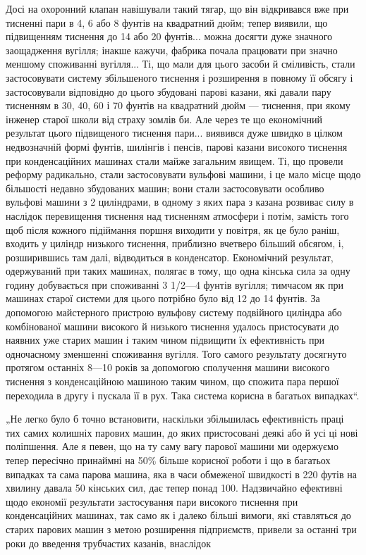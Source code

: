 Досі на охоронний клапан навішували такий тягар, що він відкривався вже при тисненні пари в 4, 6 або
8 фунтів на квадратний
дюйм; тепер виявили, що підвищенням тиснення до 14 або 20 фунтів... можна досягти дуже значного
заощадження вугілля; інакше
кажучи, фабрика почала працювати при значно меншому споживанні вугілля... Ті, що мали для цього
засоби й сміливість, стали
застосовувати систему збільшеного тиснення і розширення в повному її обсягу і застосовували
відповідно до цього збудовані парові казани, які давали пару тисненням в 30, 40, 60 і 70 фунтів на
квадратний дюйм — тиснення, при якому інженер старої школи
від страху зомлів би. Але через те що економічний результат
цього підвищеного тиснення пари... виявився дуже швидко в цілком недвозначній формі фунтів, шилінгів
і пенсів, парові казани
високого тиснення при конденсаційних машинах стали майже загальним явищем. Ті, що провели реформу
радикально, стали застосовувати вульфові машини, і це мало місце щодо більшості недавно
збудованих машин; вони стали застосовувати особливо вульфові
машини з 2 циліндрами, в одному з яких пара з казана розвиває силу в наслідок перевищення тиснення
над тисненням атмосфери і потім, замість того щоб після кожного підіймання поршня
виходити у повітря, як це було раніш, входить у циліндр
низького тиснення, приблизно вчетверо більший обсягом, і, розширившись там далі, відводиться в
конденсатор. Економічний
результат, одержуваний при таких машинах, полягає в тому, що
одна кінська сила за одну годину добувається при споживанні
3 1/2—4 фунтів вугілля; тимчасом як при машинах старої системи
для цього потрібно було від 12 до 14 фунтів. За допомогою
майстерного пристрою вульфову систему подвійного циліндра
або комбінованої машини високого й низького тиснення удалось
пристосувати до наявних уже старих машин і таким чином підвищити їх ефективність при одночасному
зменшенні споживання
вугілля. Того самого результату досягнуто протягом останніх
8—10 років за допомогою сполучення машини високого тиснення
з конденсаційною машиною таким чином, що спожита пара першої переходила в другу і пускала її в рух.
Така система корисна
в багатьох випадках“.

„Не легко було б точно встановити, наскільки збільшилась
ефективність праці тих самих колишніх парових машин, до
яких пристосовані деякі або й усі ці нові поліпшення. Але я певен, що на ту саму вагу парової машини
ми одержуємо тепер
пересічно принаймні на 50\% більше корисної роботи і що в багатьох випадках та сама парова машина,
яка в часи обмеженої
швидкості в 220 футів на хвилину давала 50 кінських сил, дає
тепер понад 100. Надзвичайно ефективні щодо економії результати
застосування пари високого тиснення при конденсаційних машинах, так само як і далеко більші вимоги,
які ставляться до старих парових машин з метою розширення підприємств, привели
за останні три роки до введення трубчастих казанів, внаслідок

